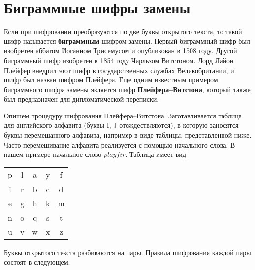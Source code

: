 \section{Биграммные шифры замены}

Если при шифровании преобразуются по две буквы открытого текста, то такой шифр называется \textbf{биграммным} шифром замены. Первый биграммный шифр был изобретен аббатом Иоганном Трисемусом и опубликован в 1508 году. Другой биграммный шифр изобретен в 1854 году Чарльзом Витстоном. Лорд Лайон Плейфер внедрил этот шифр в государственных службах Великобритании, и шифр был назван шифром Плейфера. Еще одним известным примером биграммного шифра замены является шифр  \textbf{Плейфера--Витстона}, который также был предназначен для дипломатической переписки.

Опишем процедуру шифрования Плейфера--Витстона. Заготавливается таблица для английского алфавита (буквы I, J отождествляются), в которую заносятся буквы перемешанного алфавита, например в виде таблицы, представленной ниже. Часто перемешивание алфавита реализуется с помощью начального слова. В нашем примере начальное слово $playfir$. Таблица имеет вид

\begin{center}
    \begin{tabular}{ccccc}
        p & l & a & y & f  \\
        i & r & b & c & d  \\
        e & g & h & k & m  \\
        n & o & q & s & t  \\
        u & v & w & x & z  \\
    \end{tabular}
\end{center}

Буквы открытого текста разбиваются на пары. Правила шифрования каждой пары состоят в следующем.

